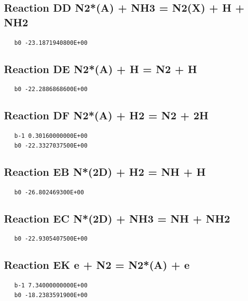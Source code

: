 \documentclass[12pt]{article}
\begin{document}
\subsection{
Reaction DD N2*(A) + NH3 = N2(X) + H + NH2 }
\begin{small}\begin{verbatim}
   b0 -23.1871940800E+00
\end{verbatim}\end{small}
\newpage

\subsection{
Reaction DE N2*(A) + H = N2 + H }
\begin{small}\begin{verbatim}
   b0 -22.2886868600E+00
\end{verbatim}\end{small}
\newpage

\subsection{
Reaction DF N2*(A) + H2 = N2 + 2H }
\begin{small}\begin{verbatim}
   b-1 0.30160000000E+00
   b0 -22.3327037500E+00
\end{verbatim}\end{small}
\newpage

\subsection{
Reaction EB N*(2D) + H2 = NH + H }
\begin{small}\begin{verbatim}
   b0 -26.802469300E+00
\end{verbatim}\end{small}
\newpage

\subsection{
Reaction EC N*(2D) + NH3 = NH + NH2 }
\begin{small}\begin{verbatim}
   b0 -22.9305407500E+00
\end{verbatim}\end{small}
\newpage

\subsection{
Reaction EK e + N2 = N2*(A) + e }
\begin{small}\begin{verbatim}
   b-1 7.34000000000E+00
   b0 -18.2383591900E+00


\end{verbatim}\end{small}
\newpage
\end{document}
